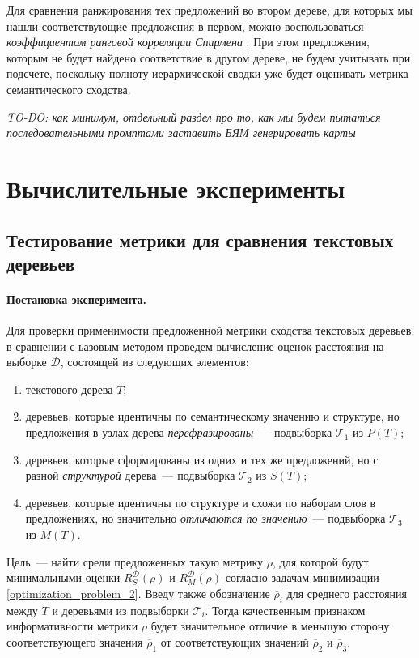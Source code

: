 \documentclass[12pt]{article}
\begin{document}
Для сравнения ранжирования тех предложений во втором дереве, для которых мы нашли соответствующие предложения в первом, можно воспользоваться \textit{коэффициентом ранговой корреляции Спирмена} \cite{spearman1904proof}. При этом предложения, которым не будет найдено соответствие в другом дереве, не будем учитывать при подсчете, поскольку полноту иерархической сводки уже будет оценивать метрика семантического сходства.

\textit{TO-DO: как минимум, отдельный раздел про то, как мы будем пытаться последовательными промптами заставить БЯМ генерировать карты} 

\newpage
\section{Вычислительные эксперименты}
\subsection{Тестирование метрики для сравнения текстовых деревьев}
\paragraph{Постановка эксперимента.}  
Для проверки применимости предложенной метрики сходства текстовых деревьев в сравнении с ьазовым методом проведем вычисление оценок расстояния на выборке $\mathcal{D}$, состоящей из следующих элементов:
\begin{enumerate}
    \item текстового дерева $T$;
    \item деревьев, которые идентичны по семантическому значению и структуре, но предложения в узлах дерева \textit{перефразированы}~--- подвыборка $\mathcal{T}_1$ из $P(T)$;
    \item деревьев, которые сформированы из одних и тех же предложений, но с разной \textit{структурой} дерева~--- подвыборка $\mathcal{T}_2$ из $S(T)$;
    \item деревьев, которые идентичны по структуре и схожи по наборам слов в предложениях, но значительно \textit{отличаются по значению}~--- подвыборка $\mathcal{T}_3$ из $M(T)$.
\end{enumerate}
Цель~--- найти среди предложенных такую метрику $\rho$, для которой будут минимальными оценки $R_S^\mathcal{D}(\rho)$ и $R_M^\mathcal{D}(\rho)$ согласно задачам минимизации \eqref{optimization_problem_2}. Введу также обозначение $\overline{\rho}_i$ для среднего расстояния между $T$ и деревьями из подвыборки $\mathcal{T}_i$. Тогда качественным признаком информативности метрики $\rho$ будет значительное отличие в меньшую сторону соответствующего значения $\overline{\rho}_1$ от соответствующих значений $\overline{\rho}_2$ и $\overline{\rho}_3$.
\end{document}
